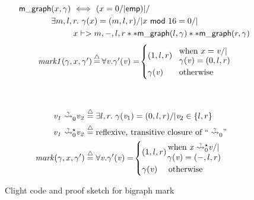 \documentclass[acmsmall,screen]{acmart}
\newcommand{\reachable}[5]{\ensuremath{{\m{#1}\;\accentset{#2}{\leadsto}^{#3}_{#4} \m{#5}}}}
\newcommand{\defeq}{\mathbin{\stackrel{\triangle}{=}}}
\newcommand{\p}[1]{\ensuremath{\mathsf{#1}}} \newcommand{\m}[1]{\ensuremath{\mathit{#1}}} \newcommand{\ma}[1]{\ensuremath{\mathcal{#1}}} \let\ramify\lightning
\begin{document}
\begin{figure}[t]
{\footnotesize
\begin{flushleft}
\hspace{-3em}
\begin{minipage}[c]{0.55\textwidth}
\begin{equation}
\label{eqn:bigraphintrofoldunfold}
\begin{split}
\quad \p{m\_graph}&(x, \gamma) ~ <=> ~ (x = 0 /| \p{emp}) |/ \null \\
& \exists m,l,r.~ \gamma(x)=(m,l,r) /| x~\mathsf{mod}~16 = 0 /| \null \\
& \qquad ~~ x |-> m,-,l,r ** \p{m\_graph}(l, \gamma) ** \p{m\_graph}(r, \gamma)
\end{split}
\end{equation}
\begin{equation*}
\begin{array}{l@{\hspace{2pt}}c@{\hspace{2pt}}l}
\quad \m{mark1}(\gamma,x,\gamma') & \defeq & \forall \m{v}. \gamma'(\m{v}) = \! \begin{cases}
(1,l,r) \! & \begin{array}{@{}l@{}}\text{when } x = \m{v} /| \null \\[-3pt] \gamma(\m{v}) = (0,l,r) \end{array} \\
\gamma(\m{v}) & \text{otherwise}
\end{cases}
\end{array}
\end{equation*}
\end{minipage}
~~ \vline
\begin{minipage}[c]{0.4\textwidth}
\begin{equation*}
\begin{split}
\reachable{v_1}{\gamma}{}{0}{v_2}\;\defeq\; &\exists l,r.~ \gamma(\m{v}_1) = (0,l,r) /| \m{v}_2 \in \{ l,r\} \\
\reachable{v_1}{\gamma}{\star}{0}{v_2}\;\defeq\;&\text{reflexive, transitive closure of ``} \reachable{}{\gamma}{}{0}{}\text{''}
\\
\;\; \m{mark}(\gamma,x,\gamma')\;\defeq\;&
\forall \m{v}. \gamma'(\m{v}) = \!
\begin{cases}
(1,l,r) \!
\begin{array}{@{}l@{}}\text{ when }
\reachable{x}{\gamma}{\star}{0}{v} /| \null \\[-2pt] \; \gamma(\m{v}) = (-,l,r)
\end{array}\\
\gamma(\m{v}) \quad \text{ otherwise}
\end{cases}
\end{split}
\end{equation*}
\end{minipage}
\end{flushleft}
}

\vspace{-0.4em}
\caption{Clight code and proof sketch for bigraph mark}
\label{fig:markgraph}
\vspace{-1em}
\end{figure}
\end{document}
